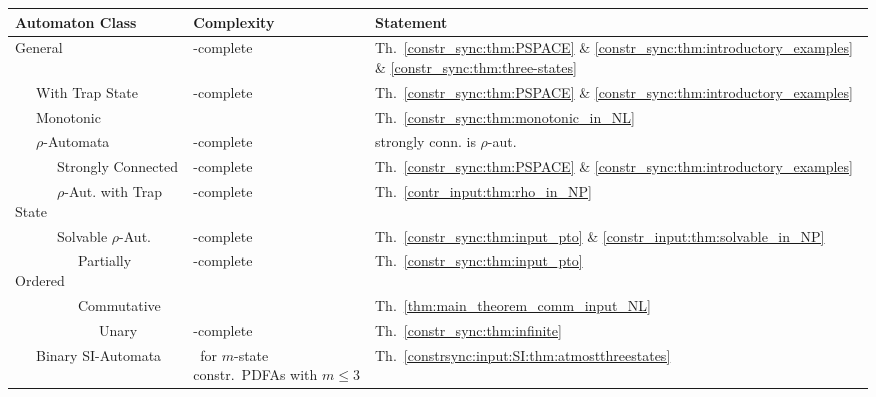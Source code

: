 \begin{table}[ht]
\newcommand{\lvl}{~~~}
\begin{tabular}{lll}
	\toprule
	\textbf{Automaton Class}   & \textbf{Complexity} & \textbf{Statement}\\
	\midrule
	General                    & \PSPACE-complete  & Th.~\ref{constr_sync:thm:PSPACE} \& \ref{constr_sync:thm:introductory_examples} \& \ref{constr_sync:thm:three-states} \\
	\lvl With Trap State       & \PSPACE-complete  & Th.~\ref{constr_sync:thm:PSPACE} \& \ref{constr_sync:thm:introductory_examples} \\	
	\lvl Monotonic             & \NL               & Th.~\ref{constr_sync:thm:monotonic_in_NL} \\
	\lvl $\rho$-Automata       & \PSPACE-complete  & \parbox[t]{4.5cm}{strongly conn. is $\rho$-aut.} \\
	\lvl\lvl Strongly Connected    & \PSPACE-complete  & Th.~\ref{constr_sync:thm:PSPACE} \& \ref{constr_sync:thm:introductory_examples}  \\
	\lvl\lvl $\rho$-Aut. with Trap State & \NP-complete & Th.~\ref{contr_input:thm:rho_in_NP} \\
	\lvl\lvl Solvable $\rho$-Aut.  & \NP-complete      & Th.~\ref{constr_sync:thm:input_pto} \& \ref{constr_input:thm:solvable_in_NP}  \\
	\lvl\lvl\lvl Partially Ordered & \NP-complete      & Th.~\ref{constr_sync:thm:input_pto} \\
	\lvl\lvl\lvl Commutative       & \NL               & Th.~\ref{thm:main_theorem_comm_input_NL} \\
	\lvl\lvl\lvl\lvl Unary         & \LOGSPACE-complete & Th.~\ref{constr_sync:thm:infinite}   \\
	\lvl Binary SI-Automata           & \parbox[t]{4.15cm}{\NL\ for $m$-state constr.~PDFAs with $m \le 3$}  & Th.~\ref{constrsync:input:SI:thm:atmostthreestates}  \\
	\bottomrule
\end{tabular}

\end{table}
